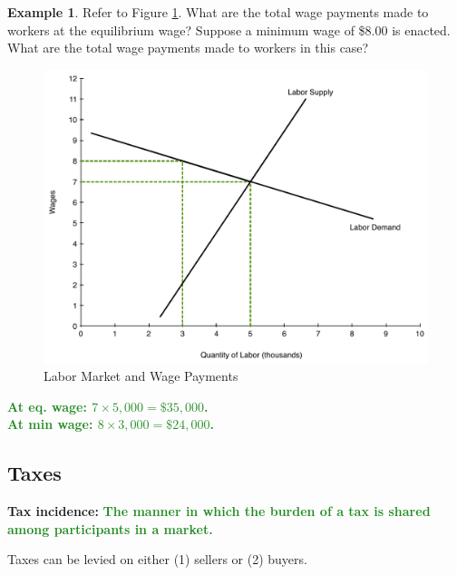 \documentclass[11pt]{article}\usepackage[]{graphicx}\usepackage[]{color}
\theoremstyle{definition}
\newtheorem{exmp}{Example}[section]
\newcommand{\ddp}[1]{{\textbf{\textcolor{ForestGreen}{#1}}}}
\newcommand{\defn}[1]{\textbf{#1}}
\begin{document}
	
	\begin{exmp} 
		Refer to Figure \ref{fig3}. What are the total wage payments made to workers at the equilibrium wage? Suppose a minimum wage of \$8.00 is enacted. What are the total wage payments made to workers in this case?
	
	\begin{figure}[H]
		\centering
		\includegraphics[scale=.4]{notes05_plot1.pdf}
		\caption{Labor Market and Wage Payments}
		\label{fig3}
	\end{figure}
	
\end{exmp}

	\ddp{At eq. wage: $7\times 5,000 = \$35,000$.\\
		At min wage: $8\times 3,000 = \$24,000$.}
	
	\subsection{Taxes}
	
	
	\defn{Tax incidence:} \ddp{The manner in which the burden of a tax is shared among participants in a market. \\}
	
	Taxes can be levied on either (1) sellers or (2) buyers. 
	
\end{document}
